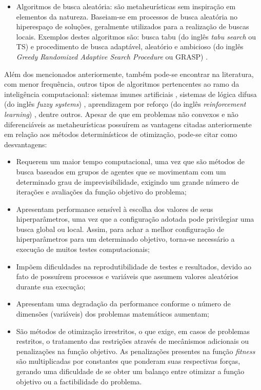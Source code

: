 \documentclass[
	12pt,				%
	openany,			%
	twoside,			%
	a4paper,			%
	chapter=TITLE,		%
	section=Title,		%
	subsection=Title,	%
	subsubsection=Title,%
	english,			%
	french,				%
	spanish,			%
	brazil			%
	]{abntex2}
\begin{document}
\begin{ERRATA}
\begin{itemize}
    
    \item Algoritmos de busca aleatória: são metaheurísticas sem inspiração em elementos da natureza. Baseiam-se em processos de busca aleatória no hiperespaço de soluções, geralmente utilizados para a realização de buscas locais. Exemplos destes algoritmos são: busca tabu (do inglês \emph{tabu search} ou TS) \cite{ts_} e procedimento de busca adaptável, aleatório e ambicioso (do inglês \emph{Greedy Randomized Adaptive Search Procedure} ou GRASP) \cite{grasp_}.

\end{itemize}


Além dos mencionados anteriormente, também pode-se encontrar na literatura, com menor frequência, outros tipos de algoritmos pertencentes ao ramo da inteligência computacional: sistemas imunes artificiais \cite{ais},  sistemas de lógica difusa (do inglês \emph{fuzzy systems}) \cite{fuzzy}, aprendizagem por reforço (do inglês \emph{reinforcement learning}) \cite{rl_}, dentre outros. Apesar de que em problemas não convexos e não diferenciáveis as metaheurísticas possuírem as vantagens citadas anteriormente em relação aos métodos determinísticos de otimização, pode-se citar como desvantagens:

\begin{itemize}
    \item Requerem um maior tempo computacional, uma vez que são métodos de busca baseados em grupos de agentes que se movimentam com um determinado grau de imprevisibilidade, exigindo um grande número de iterações e avaliações da função objetivo do problema;
    \item Apresentam performance sensível à escolha dos valores de seus hiperparâmetros, uma vez que a configuração adotada pode privilegiar uma busca global ou local. Assim, para achar a melhor configuração de hiperparâmetros para um determinado objetivo, torna-se necessário a execução de muitos testes computacionais;
    \item Impõem dificuldades na reprodutibilidade de testes e resultados, devido ao fato de possuírem processos e variáveis que assumem valores aleatórios durante sua execução;
    \item Apresentam uma degradação da performance conforme o número de dimensões (variáveis) dos problemas matemáticos aumentam;
    \item São métodos de otimização irrestritos, o que exige, em casos de problemas restritos, o tratamento das restrições através de mecânismos adicionais ou penalizações na função objetivo. As penalizações presentes na função \emph{fitness} são multiplicadas por constantes que ponderam suas respectivas forças, gerando uma dificuldade de se obter um balanço entre otimizar a função objetivo ou a factibilidade do problema.


\end{itemize}
\end{ERRATA}
\end{document}

